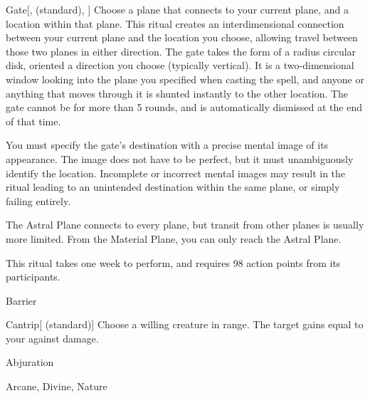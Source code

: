 \lowercase{\hypertarget{spell:Gate}{}}\label{spell:Gate}
\begin{ability}[\nth{7}]{\hypertarget{spell:Gate}{Gate}}[,  (standard), ]
Choose a plane that connects to your current plane, and a location within that plane.
This ritual creates an interdimensional connection between your current plane and the location you choose, allowing travel between those two planes in either direction.
The gate takes the form of a \areasmall radius circular disk, oriented a direction you choose (typically vertical).
It is a two-dimensional window looking into the plane you specified when casting the spell, and anyone or anything that moves through it is shunted instantly to the other location.
The gate cannot be  for more than 5 rounds, and is automatically dismissed at the end of that time.

You must specify the gate's destination with a precise mental image of its appearance.
The image does not have to be perfect, but it must unambiguously identify the location.
Incomplete or incorrect mental images may result in the ritual leading to an unintended destination within the same plane, or simply failing entirely.

The Astral Plane connects to every plane, but transit from other planes is usually more limited.
From the Material Plane, you can only reach the Astral Plane.

This ritual takes one week to perform, and requires 98 action points from its participants.
\end{ability}
\vspace{0.25em}


\newpage
\begin{spellsection}{Barrier}

\begin{spellheader}
\end{spellheader}


\begin{ability}{Cantrip}[ (standard)]
Choose a willing creature in \rngclose range.
The target gains  equal to your  against  damage.
\end{ability}




 Abjuration

 Arcane, Divine, Nature
\end{spellsection}


